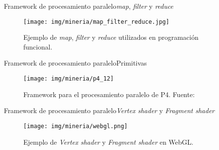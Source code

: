 \documentclass[10pt]{beamer}
\newcommand{\1}{
	\setbeamertemplate{background}{
		\texttt{[image: img/1]}
		\tikz[overlay] \fill[fill opacity=0.75,fill=white] (0,0) rectangle (-\paperwidth,\paperheight);
	}
}
\begin{document}
\begin{frame}{Framework de procesamiento paralelo}{\textit{map}, \textit{filter} y \textit{reduce}}
\begin{figure}[]
	\centering
	\texttt{[image: img/mineria/map\_filter\_reduce.jpg]}
	\caption{Ejemplo de \textit{map}, \textit{filter} y \textit{reduce} utilizados en programación funcional.}
\end{figure}
\end{frame}


\begin{frame}{Framework de procesamiento paralelo}{Primitivas}
\begin{figure}[]
	\centering
	\texttt{[image: img/mineria/p4\_12]}
	\caption{Framework para el procesamiento paralelo de P4. Fuente: \cite{li2018p4}}
\end{figure}
\end{frame}


\begin{frame}{Framework de procesamiento paralelo}{\textit{Vertex shader} y \textit{Fragment shader}}
\begin{figure}[]
	\centering
	\texttt{[image: img/mineria/webgl.png]}
	\caption{Ejemplo de \textit{Vertex shader} y \textit{Fragment shader} en WebGL.}
\end{figure}
\end{frame}
\end{document}
